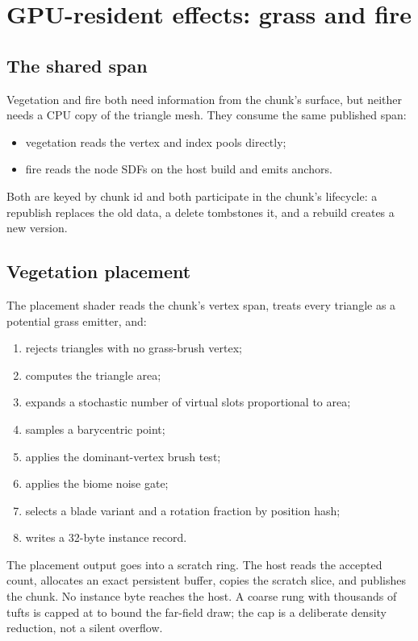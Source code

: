 \section{GPU-resident effects: grass and fire}
\label{sec:effects}

\subsection{The shared span}

Vegetation and fire both need information from the chunk's surface, but
neither needs a CPU copy of the triangle mesh.  They consume the same
published span:
\begin{itemize}
\item vegetation reads the vertex and index pools directly;
\item fire reads the node SDFs on the host build and emits anchors.
\end{itemize}
Both are keyed by chunk id and both participate in the chunk's lifecycle:
a republish replaces the old data, a delete tombstones it, and a rebuild
creates a new version.

\subsection{Vegetation placement}

The placement shader  reads the chunk's
vertex span, treats every triangle as a potential grass emitter, and:
\begin{enumerate}
\item rejects triangles with no grass-brush vertex;
\item computes the triangle area;
\item expands a stochastic number of virtual slots proportional to area;
\item samples a barycentric point;
\item applies the dominant-vertex brush test;
\item applies the biome noise gate;
\item selects a blade variant and a rotation fraction by position hash;
\item writes a 32-byte instance record.
\end{enumerate}
The placement output goes into a scratch ring.  The host reads the accepted
count, allocates an exact persistent buffer, copies the scratch slice, and
publishes the chunk.  No instance byte reaches the host.  A coarse rung
with thousands of tufts is capped at  to
bound the far-field draw; the cap is a deliberate density reduction, not a
silent overflow.

